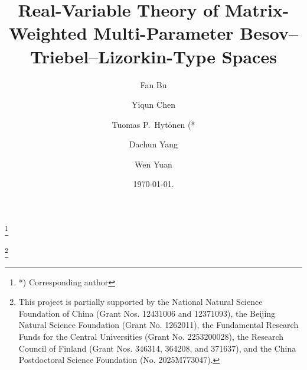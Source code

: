 \documentclass[11pt, reqno]{amsart}
\theoremstyle{definition}
\theoremstyle{remark}
\numberwithin{equation}{section}
\begin{document}
\title[Matrix-weighted multi-parameter function spaces]{Real-Variable Theory
of Matrix-Weighted Multi-Parameter Besov--Triebel--Lizorkin-Type Spaces}

\author[F. Bu]{Fan Bu}
\address{Laboratory of Mathematics and Complex Systems (Ministry of Education of China),
School of Mathematical Sciences, Beijing Normal University, Beijing 100875,
The People's Republic of China}
\curraddr{}


\author[Y. Chen]{Yiqun Chen}
\address{Laboratory of Mathematics and Complex Systems (Ministry of Education of China),
School of Mathematical Sciences, Beijing Normal University, Beijing 100875, The People's Republic of China}
\curraddr{}

\author[T. P. Hyt\"onen]{Tuomas P.\ Hyt\"onen (*}
\address{Department of Mathematics and Systems Analysis, Aalto University, P.O. Box 11100 (Otakaari~1), \mbox{FI-00076} Aalto, Finland}
\curraddr{}

\thanks{*) Corresponding author}

\author[D. Yang]{Dachun Yang}
\address{Laboratory of Mathematics and Complex Systems (Ministry of Education of China),
School of Mathematical Sciences, Institute for Advanced Study, Beijing Normal University, Beijing 100875, The People's Republic of China}
\curraddr{}


\author[W. Yuan]{Wen Yuan}
\address{Laboratory of Mathematics and Complex Systems (Ministry of Education of China),
School of Mathematical Sciences, Beijing Normal University, Beijing 100875, The People's Republic of China}
\curraddr{}

\thanks{This project is partially supported by the National
Natural Science Foundation of China (Grant Nos. 12431006 and 12371093),
the Beijing Natural Science Foundation (Grant No. 1262011),
the Fundamental Research Funds for the Central Universities (Grant No. 2253200028),
the Research Council of Finland (Grant Nos. 346314, 364208, and 371637), and
the China Postdoctoral Science Foundation (No. 2025M773047).}

\date{\today.}


\end{document}
